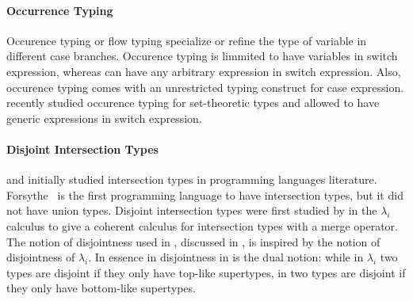 \paragraph{Occurrence Typing}
Occurence typing or flow typing \citet{tobin2008design} specialize or refine the type of variable in different
case branches. Occurence typing is limmited to have variables in switch expression, whereas \cal
can have any arbitrary expression in switch expression.
Also, occurence typing comes with an
unrestricted typing construct for case expression. \citet{castagna2019revisiting} recently studied
occurence typing for set-theoretic types and allowed to have generic expressions in switch expression.

\paragraph{Disjoint Intersection Types}
\citet{pottinger1980type} and \citet{coppo1981functional} initially
studied intersection types in programming languages
literature. Forsythe~\cite{reynolds1988preliminary} is the first 
programming language to have intersection types, but it did not
have union types.  Disjoint intersection types were first
studied by \citet{oliveira2016disjoint} in the $\lambda_{i}$ calculus
to give a coherent calculus for intersection types with a merge
operator. The notion of disjointness used in \cal, discussed in ,
is inspired by the notion of disjointness of $\lambda_{i}$. In essence in
disjointness in \cal is the dual notion: while in $\lambda_{i}$ two types
are disjoint if they only have top-like supertypes, in \cal two types
are disjoint if they only have bottom-like supertypes.

